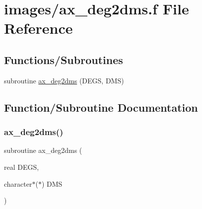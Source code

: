 \hypertarget{ax__deg2dms_8f}{}\section{images/ax\+\_\+deg2dms.f File Reference}
\label{ax__deg2dms_8f}
\subsection*{Functions/\+Subroutines}
\begin{DoxyCompactItemize}
\item 
subroutine \hyperlink{ax__deg2dms_8f_acace10eb5e5395fa31d58867491d906d}{ax\+\_\+deg2dms} (D\+E\+GS, D\+MS)
\end{DoxyCompactItemize}


\subsection{Function/\+Subroutine Documentation}
\mbox{\label{ax__deg2dms_8f_acace10eb5e5395fa31d58867491d906d}} 
\subsubsection{\texorpdfstring{ax\+\_\+deg2dms()}{ax\_deg2dms()}}
{\footnotesize\ttfamily subroutine ax\+\_\+deg2dms (\begin{DoxyParamCaption}\item[{real}]{D\+E\+GS,  }\item[{character$\ast$($\ast$)}]{D\+MS }\end{DoxyParamCaption})}


